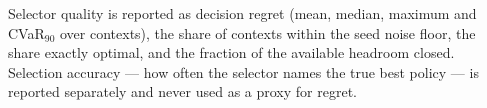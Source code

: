Selector quality is reported as decision regret (mean, median, maximum and
CVaR$_{90}$ over contexts), the share of contexts within the seed noise floor,
the share exactly optimal, and the fraction of the available headroom closed.
Selection accuracy --- how often the selector names the true best policy --- is
reported separately and never used as a proxy for regret.
